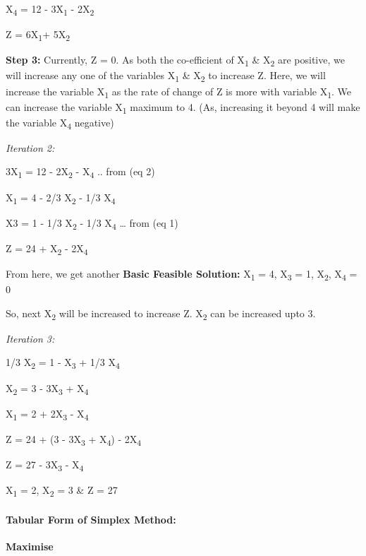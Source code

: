 \documentclass[]{article}
\let\oldparagraph\paragraph
\renewcommand{\paragraph}[1]{\oldparagraph{#1}\mbox{}}
\begin{document}
X\textsubscript{4} = 12 - 3X\textsubscript{1} - 2X\textsubscript{2}

Z = 6X\textsubscript{1}+ 5X\textsubscript{2}

\textbf{Step 3:} Currently, Z = 0. As both the co-efficient of
X\textsubscript{1} \& X\textsubscript{2} are positive, we will increase
any one of the variables X\textsubscript{1} \& X\textsubscript{2} to
increase Z. Here, we will increase the variable X\textsubscript{1} as
the rate of change of Z is more with variable X\textsubscript{1}. We can
increase the variable X\textsubscript{1} maximum to 4. (As, increasing
it beyond 4 will make the variable X\textsubscript{4} negative)

\emph{Iteration 2:}

3X\textsubscript{1} = 12 - 2X\textsubscript{2} - X\textsubscript{4} ..
from (eq 2)

X\textsubscript{1} = 4 - 2/3 X\textsubscript{2} - 1/3 X\textsubscript{4}

X3 = 1 - 1/3 X\textsubscript{2} - 1/3 X\textsubscript{4} \ldots{} from
(eq 1)

Z = 24 + X\textsubscript{2} - 2X\textsubscript{4}

From here, we get another \textbf{Basic Feasible Solution:}
X\textsubscript{1} = 4, X\textsubscript{3} = 1, X\textsubscript{2},
X\textsubscript{4} = 0

So, next X\textsubscript{2} will be increased to increase Z.
X\textsubscript{2} can be increased upto 3.

\emph{Iteration 3:}

1/3 X\textsubscript{2} = 1 - X\textsubscript{3} + 1/3 X\textsubscript{4}

X\textsubscript{2} = 3 - 3X\textsubscript{3} + X\textsubscript{4}

X\textsubscript{1} = 2 + 2X\textsubscript{3} - X\textsubscript{4}

Z = 24 + (3 - 3X\textsubscript{3} + X\textsubscript{4}) -
2X\textsubscript{4}

Z = 27 - 3X\textsubscript{3} - X\textsubscript{4}

X\textsubscript{1} = 2, X\textsubscript{2} = 3 \& Z = 27

\paragraph{Tabular Form of Simplex
Method:}\label{tabular-form-of-simplex-method}

\textbf{Maximise}
\end{document}
